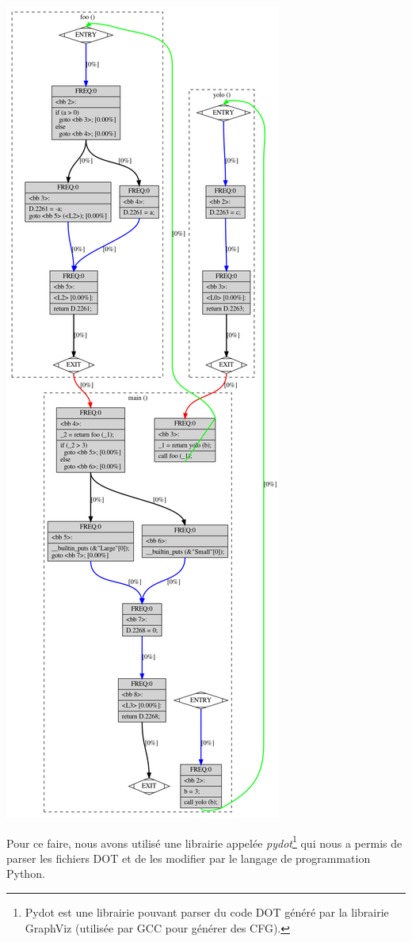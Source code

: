 \begin{center}
    \includegraphics[scale=0.26]{images/cfg_apres.png}
\end{center}
Pour ce faire, nous avons utilisé une librairie appelée \textit{pydot}\footnote{Pydot est une librairie pouvant parser du code DOT généré par la librairie GraphViz (utilisée par GCC pour générer des CFG).} qui nous a permis de parser les fichiers DOT et de les modifier par le langage de programmation Python.

